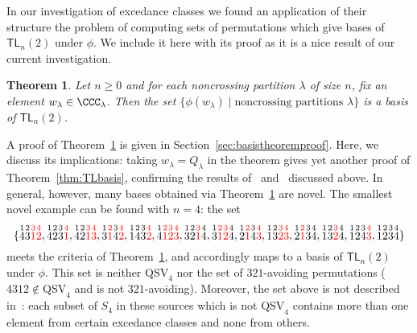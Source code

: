 \documentclass[12pt]{amsart}
\newtheorem{thm}[equation]{Theorem}
\theoremstyle{definition}
\theoremstyle{remark}
\numberwithin{equation}{section}
\newcommand{\TL}{\mathsf{TL}}
\newcommand{\QSV}{\mathrm{QSV}}
\begin{document}
In our investigation of excedance classes we found an application of their structure the problem of computing sets of permutations which give bases of $\TL_{n}(2)$ under $\phi$.  
We include it here with its proof as it is a nice result of our current investigation.

\begin{thm}
\label{thm:TLbases}
Let $n \ge 0$ and for each noncrossing partition $\lambda$ of size $n$, fix an element $w_{\lambda} \in \CCC_{\lambda}$. Then the set $\{\phi(w_{\lambda}) \;|\; \text{noncrossing partitions $\lambda$}\}$ is a basis of $\TL_{n}(2)$.
\end{thm}

A proof of Theorem~\ref{thm:TLbases} is given in Section~\ref{sec:basistheoremproof}.  Here, we discuss its implications: taking $w_{\lambda} = Q_{\lambda}$ in the theorem gives yet another proof of Theorem~\ref{thm:TLbasis}, confirming the results of~\cite{GobetWilliams} and~\cite{Zinno} discussed above.  In general, however, many bases obtained via Theorem~\ref{thm:TLbases} are novel.  The smallest novel example can be found with $n = 4$: the set 
\[
\{
\stackrel{1}{4} \stackrel{2}{3} \color{red} \stackrel{3}{1} \stackrel{4}{2} \color{black}, 
\stackrel{1}{4} \stackrel{2}{2} \stackrel{3}{3}  \color{red} \stackrel{4}{1} \color{black}, 
\stackrel{1}{4} \stackrel{2}{2}\color{red}  \stackrel{3}{1} \stackrel{4}{3} \color{black}, 
\stackrel{1}{3} \color{red}  \stackrel{2}{1} \color{black} \stackrel{3}{4} \color{red} \stackrel{4}{2}\color{black} , 
\stackrel{1}{1} \stackrel{2}{4} \stackrel{3}{3} \color{red} \stackrel{4}{2} \color{black}, 
\stackrel{1}{4} \color{red} \stackrel{2}{1} \stackrel{3}{2} \stackrel{4}{3} \color{black}, 
\stackrel{1}{3} \stackrel{2}{2} \color{red} \stackrel{3}{1} \color{black} \stackrel{4}{4}, 
\stackrel{1}{3} \color{red} \stackrel{2}{1} \stackrel{3}{2} \color{black} \stackrel{4}{4}, 
\stackrel{1}{2} \color{red} \stackrel{2}{1} \color{black} \stackrel{3}{4} \color{red} \stackrel{4}{3} \color{black}, 
\stackrel{1}{1} \stackrel{2}{3} \color{red} \stackrel{3}{2} \stackrel{4}{3} \color{black}, 
\stackrel{1}{2}  \color{red} \stackrel{2}{1} \color{black} \stackrel{3}{3} \stackrel{4}{4}, 
\stackrel{1}{1} \stackrel{2}{3} \color{red} \stackrel{3}{2} \color{black} \stackrel{4}{4}, 
\stackrel{1}{1} \stackrel{2}{2} \stackrel{3}{4}  \color{red} \stackrel{4}{3} \color{black},
\stackrel{1}{1} \stackrel{2}{2} \stackrel{3}{3} \stackrel{4}{4}
\}
\]
meets the criteria of Theorem~\ref{thm:TLbases}, and accordingly maps to a basis of $\TL_{n}(2)$ under $\phi$. 
This set is neither $\QSV_{4}$ nor the set of $321$-avoiding permutations ($4312 \notin \QSV_{4}$ and is not $321$-avoiding).
Moreover, the set above is not described in~\cite{GobetWilliams, Zinno}: each subset of $S_{4}$ in these sources which is not $\QSV_{4}$ contains more than one element from certain excedance classes and none from others.  
 
\end{document}
